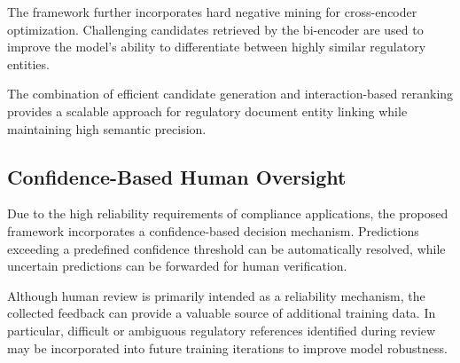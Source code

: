 The framework further incorporates hard negative mining for cross-encoder optimization. Challenging candidates retrieved by the bi-encoder are used to improve the model's ability to differentiate between highly similar regulatory entities.

The combination of efficient candidate generation and interaction-based reranking provides a scalable approach for regulatory document entity linking while maintaining high semantic precision.

\subsection{Confidence-Based Human Oversight}

Due to the high reliability requirements of compliance applications, the proposed framework incorporates a confidence-based decision mechanism. Predictions exceeding a predefined confidence threshold can be automatically resolved, while uncertain predictions can be forwarded for human verification.

Although human review is primarily intended as a reliability mechanism, the collected feedback can provide a valuable source of additional training data. In particular, difficult or ambiguous regulatory references identified during review may be incorporated into future training iterations to improve model robustness.

